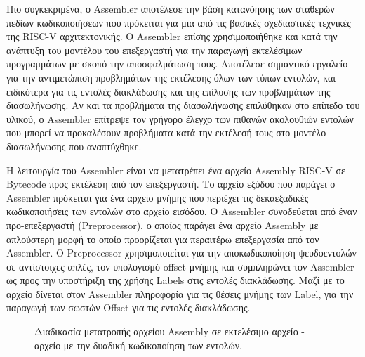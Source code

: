 \documentclass[11pt]{extarticle}
\begin{document}
Πιο συγκεκριμένα, ο Assembler αποτέλεσε την βάση κατανόησης των σταθερών πεδίων κωδικοποιήσεων που πρόκειται για μια από τις βασικές σχεδιαστικές τεχνικές της RISC-V αρχιτεκτονικής.
Ο Assembler επίσης χρησιμοποιήθηκε και κατά την ανάπτυξη του μοντέλου του επεξεργαστή για την παραγωγή εκτελέσιμων προγραμμάτων με σκοπό την αποσφαλμάτωση τους.
Αποτέλεσε σημαντικό εργαλείο για την αντιμετώπιση προβλημάτων της εκτέλεσης όλων των τύπων εντολών, και ειδικότερα για τις εντολές διακλάδωσης και της επίλυσης των προβλημάτων της διασωλήνωσης.
Αν και τα προβλήματα της διασωλήνωσης επιλύθηκαν στο επίπεδο του υλικού, ο Assembler επίτρεψε τον γρήγορο έλεγχο των πιθανών ακολουθιών εντολών που μπορεί να προκαλέσουν προβλήματα κατά την εκτέλεσή τους στο μοντέλο διασωλήνωσης που αναπτύχθηκε.

Η λειτουργία του Assembler είναι να μετατρέπει ένα αρχείο Assembly RISC-V σε Bytecode προς εκτέλεση από τον επεξεργαστή.
Το αρχείο εξόδου που παράγει ο Assembler πρόκειται για ένα αρχείο μνήμης που περιέχει τις δεκαεξαδικές κωδικοποιήσεις των εντολών στο αρχείο εισόδου.
Ο Assembler συνοδεύεται από έναν προ-επεξεργαστή (Preprocessor), ο οποίος παράγει ένα αρχείο Assembly με απλούστερη μορφή το οποίο προορίζεται για περαιτέρω επεξεργασία από τον Assembler.
Ο Preprocessor χρησιμοποιείται για την αποκωδικοποίηση ψευδοεντολών σε αντίστοιχες απλές, τον υπολογισμό offset μνήμης και συμπληρώνει τον Assembler ως προς την υποστήριξη της χρήσης Labels στις εντολές διακλάδωσης.
Μαζί με το αρχείο δίνεται στον Assembler πληροφορία για τις θέσεις μνήμης των Label, για την παραγωγή των σωστών Offset για τις εντολές διακλάδωσης.

\begin{figure}[H]
    \centering
    \caption[Assembly σε Εκτελέσιμο]{Διαδικασία μετατροπής αρχείου Assembly σε εκτελέσιμο αρχείο - αρχείο με την δυαδική κωδικοποίηση των εντολών.}
\end{figure}

\newpage
\end{document}

